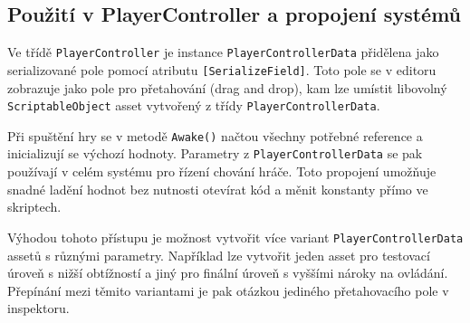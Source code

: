 \subsection{Použití v PlayerController a propojení systémů}

Ve třídě \texttt{PlayerController} je instance \texttt{PlayerControllerData} přidělena jako serializované pole pomocí atributu \texttt{[SerializeField]}. Toto pole se v editoru zobrazuje jako pole pro přetahování (drag and drop), kam lze umístit libovolný \texttt{ScriptableObject} asset vytvořený z třídy \texttt{PlayerControllerData}.

Při spuštění hry se v metodě \texttt{Awake()} načtou všechny potřebné reference a inicializují se výchozí hodnoty. Parametry z \texttt{PlayerControllerData} se pak používají v celém systému pro řízení chování hráče. Toto propojení umožňuje snadné ladění hodnot bez nutnosti otevírat kód a měnit konstanty přímo ve skriptech.

Výhodou tohoto přístupu je možnost vytvořit více variant \texttt{PlayerControllerData} assetů s různými parametry. Například lze vytvořit jeden asset pro testovací úroveň s nižší obtížností a jiný pro finální úroveň s vyššími nároky na ovládání. Přepínání mezi těmito variantami je pak otázkou jediného přetahovacího pole v inspektoru.